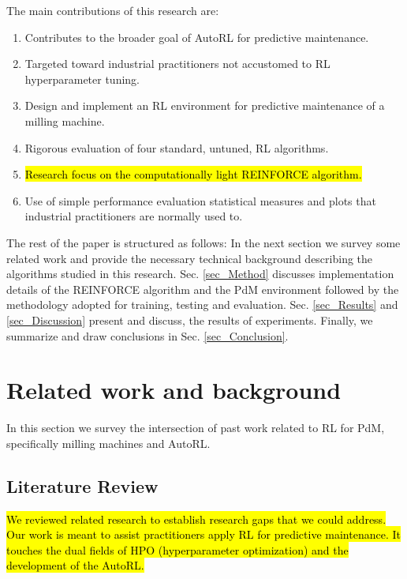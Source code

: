 \documentclass[referee, sn-mathphys-num]{sn-jnl}
\newcommand{\hlc}[2][cyan!15]{{\colorlet{foo}{#1}\sethlcolor{foo}\hl{#2}}}
\begin{document}
	The main contributions of this research are:
	\begin{enumerate}
		\item Contributes to the broader goal of AutoRL for predictive maintenance.
		\item Targeted toward industrial practitioners not accustomed to RL hyperparameter tuning.
		\item Design and implement an RL environment for predictive maintenance of a milling machine.
		\item Rigorous evaluation of four standard, untuned, RL algorithms.
		\item \hlc{Research focus on the computationally light REINFORCE algorithm.}
		\item Use of simple performance evaluation statistical measures and plots that industrial practitioners are normally used to.
	\end{enumerate} 
	
	The rest of the paper is structured as follows: In the next section we survey some related work and provide the necessary technical background describing the algorithms studied in this research. Sec. \ref{sec_Method} discusses implementation details of the REINFORCE algorithm and the PdM environment followed by the methodology adopted for training, testing and evaluation. Sec. \ref{sec_Results} and \ref{sec_Discussion} present and discuss, the results of experiments. Finally, we summarize and draw conclusions in Sec. \ref{sec_Conclusion}.
	
	\section{Related work and background}\label{sec_SLR}
	In this section we survey the intersection of past work related to RL for PdM, specifically milling machines and AutoRL.
	
	\subsection{Literature Review}
	\hlc{We reviewed related research to establish research gaps that we could address. Our work is meant to assist practitioners apply RL for predictive maintenance. It touches the dual fields of HPO (hyperparameter optimization) and the development of the AutoRL.} 
	
\end{document}

